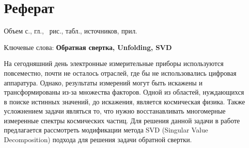 \documentclass[a4paper,12pt]{diplom}
\begin{document}










\maketitle
\chapter*{Реферат}

Объем  с.,  гл., \totalfigures\ рис.,
 табл.,  источников,  прил.

\medskip

Ключевые слова: \textbf{Обратная свертка, Unfolding, SVD}

\medskip

На сегодняшний день электронные измерительные приборы используются повсеместно, почти не осталось отраслей, где бы не использовались цифровая аппаратура. 
Однако, результаты измерений могут быть искажены и трансформированы из-за множества факторов. Одной из областей, нуждающихся в поиске истинных 
значений, до искажения, является космическая физика. Также усложнением задачи являться то, что нужно восстанавливать многомерные измеренные спектры 
космических частиц. Для решения данной задачи в работе предлагается рассмотреть модификации метода SVD (Singular Value Decomposition) подхода для 
решения задачи обратной свертки.
\end{document}
